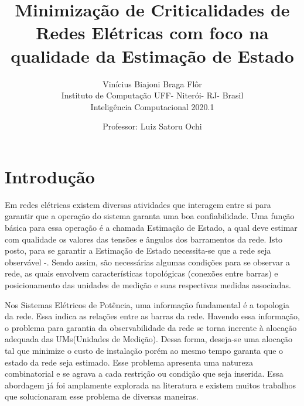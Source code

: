 \documentclass[12pt]{article}
\title{Minimização de Criticalidades de Redes Elétricas com foco na qualidade da Estimação de Estado}
\author{Vinícius Biajoni Braga Flôr\\ Instituto de Computação UFF- Niterói- RJ- Brasil\\ Inteligência Computacional 2020.1}
\date{Professor: Luiz Satoru Ochi}
\begin{document}
\maketitle

{}


\section{Introdução}

Em redes elétricas existem diversas atividades que interagem entre si para garantir que a operação do sistema garanta uma boa confiabilidade. Uma função básica para essa operação é a chamada Estimação de Estado, a qual deve estimar com qualidade os valores das tensões e ângulos dos barramentos da rede. Isto posto, para se garantir a Estimação de Estado necessita-se que a rede seja observável \cite{Abur04}-\cite{Mont99}. Sendo assim, são necessárias algumas condições para se observar a rede, as quais envolvem características topológicas (conexões entre barras) e posicionamento das unidades de medição e suas respectivas medidas associadas.

Nos Sistemas Elétricos de Potência, uma informação fundamental é a topologia da rede. Essa indica as relações entre as barras da rede. Havendo essa informação, o problema para garantia da observabilidade da rede se torna inerente à alocação adequada das UMs(Unidades de Medição). Dessa forma, deseja-se uma alocação tal que minimize o custo de instalação porém ao mesmo tempo garanta que o estado da rede seja estimado. Esse problema apresenta uma natureza combinatorial e se agrava a cada restrição ou condição que seja inserida. Essa abordagem já foi amplamente explorada na literatura e existem muitos trabalhos que solucionaram esse problema de diversas maneiras.
\end{document}

